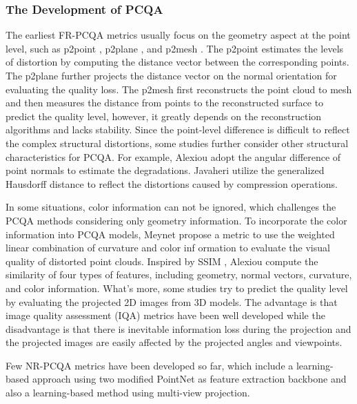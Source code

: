\documentclass[lettersize,journal]{IEEEtran}
\begin{document}
\subsubsection{The Development of PCQA}
The earliest FR-PCQA metrics usually focus on the geometry aspect at the point level, such as p2point \cite{p2point}, p2plane \cite{p2plane}, and p2mesh \cite{p2mesh}. The p2point estimates the levels of distortion by computing the distance vector between the corresponding points. The p2plane further projects the distance vector on the normal orientation for evaluating the quality loss. The p2mesh first reconstructs the point cloud to mesh and then measures the distance from points to the reconstructed surface to predict the quality level, however, it greatly depends on the reconstruction algorithms and lacks stability. Since the point-level difference is difficult to reflect the complex structural distortions, some studies further consider other structural characteristics for PCQA. For example, Alexiou   \cite{angular} adopt the angular difference of point normals to estimate the degradations. Javaheri   \cite{pcqa2} utilize the generalized Hausdorff distance to reflect the distortions caused by compression operations.

In some situations, color information can not be ignored, which challenges the PCQA methods considering only geometry information. To incorporate the color information into PCQA models, Meynet   \cite{pcqm} propose a metric to use the weighted linear combination of curvature and color inf ormation to evaluate the visual quality of distorted point clouds. Inspired by SSIM \cite{ssim}, Alexiou   \cite{pcqa3} compute the similarity of four types of features, including geometry, normal vectors, curvature, and color information. What's more, some studies  \cite{sjtu-pcqa} \cite{pcqa_database2} try to predict the quality level by evaluating the projected 2D images from 3D models. The advantage is that image quality assessment (IQA) metrics have been well developed while the disadvantage is that there is inevitable information loss during the projection and the projected images are easily affected by the projected angles and viewpoints.

Few NR-PCQA metrics have been developed so far, which include a learning-based approach \cite{pcqa-large-scale} using two modified PointNet \cite{Qi_2017_CVPR} as feature extraction backbone and also a learning-based method \cite{liu2021pqa} using multi-view projection. 
\end{document}

